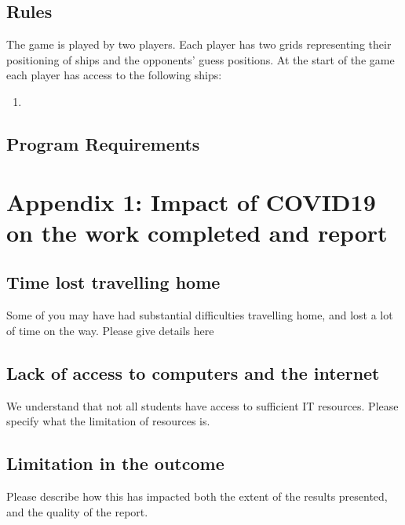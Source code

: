 \documentclass[11pt]{article} %
\begin{document}
\subsection{Rules}
The game is played by two players.
Each player has two grids representing their positioning of ships and the opponents' guess positions.
At the start of the game each player has access to the following ships:
\begin{enumerate}[1)]
  \item
\end{enumerate}
\subsection{Program Requirements}

\newpage
\section*{Appendix 1: Impact of COVID19 on the work completed and report}
\subsection{Time lost travelling home}
Some of you may have had substantial difficulties travelling home, and lost a lot of time on the way. Please give details here
\subsection{Lack of access to computers and the internet}
We understand that not all students have access to sufficient IT resources. Please specify what the limitation of resources is.
\subsection{Limitation in the outcome}
Please describe how this has impacted both the extent of the results presented, and the quality of the report.
\end{document}
